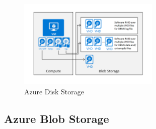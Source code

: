 \documentclass{article}
\begin{document}
\begin{figure}[H]
    \centering
    \includegraphics[width=0.6\textwidth]{azure-storage-disk.png}
    \caption{Azure Disk Storage}
\end{figure}

\subsection{Azure Blob Storage}
\end{document}
